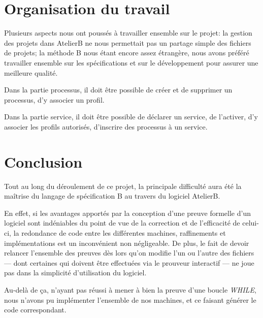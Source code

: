 \documentclass[french, titlepage, 10pt, a4paper]{article}
\begin{document}
\section{Organisation du travail}

Plusieurs aspects nous ont poussés à travailler ensemble sur le projet: la
gestion des projets dans AtelierB ne nous permettait pas un partage simple des
fichiers de projets; la méthode B nous étant encore assez étrangère, nous avons
préféré travailler ensemble sur les spécifications et sur le développement pour
assurer une meilleure qualité.

Dans la partie processus, il doit être possible de créer et de supprimer un
processus, d'y associer un profil.

Dans la partie service, il doit être possible de déclarer un service, de
l'activer, d'y associer les profils autorisés, d'inscrire des processus à un
service.

\section{Conclusion}

Tout au long du déroulement de ce projet, la principale difficulté aura été la
maîtrise du langage de spécification B au travers du logiciel AtelierB.

En effet, si les avantages apportés par la conception d'une preuve formelle d'un
logiciel sont indéniables du point de vue de la correction et de l'efficacité de
celui-ci, la redondance de code entre les différentes machines, raffinements et
implémentations est un inconvénient non négligeable.
De plus, le fait de devoir relancer l'ensemble des preuves dès lors qu'on
modifie l'un ou l'autre des fichiers --- dont certaines qui doivent être
effectuées via le prouveur interactif --- ne joue pas dans la simplicité
d'utilisation du logiciel.

Au-delà de ça, n'ayant pas réussi à mener à bien la preuve d'une boucle \emph
{WHILE}, nous n'avons pu implémenter l'ensemble de nos machines, et ce faisant
générer le code correspondant.
\end{document}
